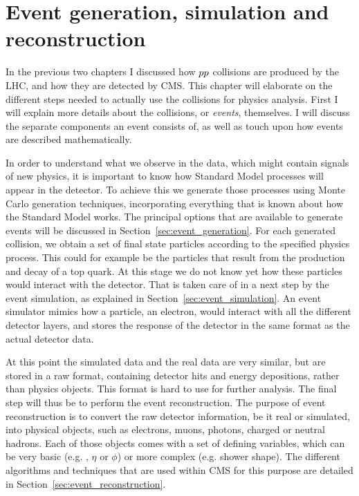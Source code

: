 \chapter[Event generation, simulation, reconstruction]{Event generation, simulation and
reconstruction \label{chap:event_generation}}

In the previous two chapters I discussed how ${p}{p}$ collisions are produced by the LHC, and
how they are detected by CMS. This chapter will elaborate on the different
steps needed to actually use the collisions for physics analysis. 
First I will explain more details about the collisions, or \textit{events}, themselves. I will
discuss the separate components an event consists of, as well as touch upon how events are described
mathematically. 

In order to understand what we observe in the data, which might contain signals of new physics, it
is important to know how Standard Model processes will appear in the detector. To achieve this we
generate those processes using Monte Carlo generation techniques, incorporating everything that is
known about how the Standard Model works. The principal options that are available to generate
events will be discussed in Section~\ref{sec:event_generation}. 
For each generated collision, we obtain a set of final state particles according to the specified
physics process. This could for example be the particles that result from the production and decay
of a top quark. 
At this stage we do not know yet how these particles would interact with the detector. That is
taken care of in a next step by the event simulation, as explained in
Section~\ref{sec:event_simulation}. An event simulator mimics how a particle, \eg an electron,
would interact with all the different detector layers, and stores the response of the detector in
the same format as the actual detector data. 

At this point the simulated data and the real data are very similar, but are stored in a raw format,
containing detector hits and energy depositions, rather than physics objects. This format is hard to
use for further analysis. The final step will thus be to perform the event reconstruction. The
purpose of event reconstruction is to convert the raw detector information, be it real or simulated,
into physical objects, such as electrons, muons, photons, charged or neutral hadrons. Each of those
objects comes with a set of defining variables, which can be very basic (e.g. \pt, $\eta$ or $\phi$)
or more complex (e.g. shower shape). The different algorithms and techniques that are used within
CMS for this purpose are detailed in Section~\ref{sec:event_reconstruction}. 

